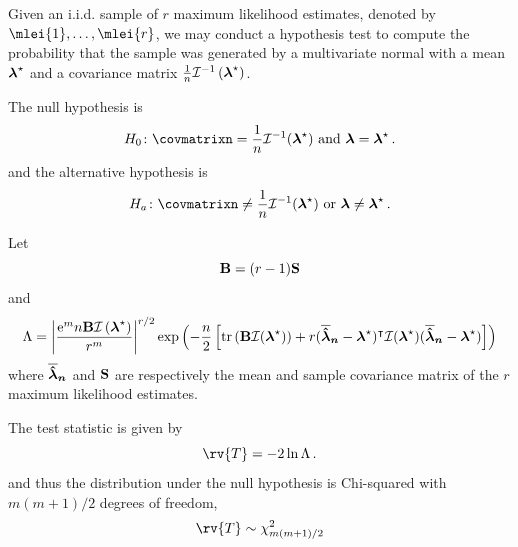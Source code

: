 \documentclass[../main.tex]{subfiles}
\begin{document}
Given an i.i.d. sample of $r$ maximum likelihood estimates, denoted by $\mlei{1}, \ldots, \mlei{r}$, we may conduct a hypothesis test to compute the probability that the sample was generated by a multivariate normal with a mean ${\boldsymbol{\lambda}}^{\star}$ and a covariance matrix $\frac{1}{n} \mathcal{I}^{-1}\left({\boldsymbol{\lambda}}^{\star}\right)$.

The null hypothesis is
\begin{equation}
    H_0 \colon \covmatrixn = \frac{1}{n} \infomatrx^{-1}(\tparam{\vec\lambda}) \text{ and } \vec\lambda = \tparam{\vec\lambda}\,.
\end{equation}
and the alternative hypothesis is
\begin{equation}
    H_a \colon \covmatrixn \neq \frac{1}{n} \infomatrx^{-1}(\tparam{\vec\lambda}) \text{ or } \vec\lambda \neq \tparam{\vec\lambda}\,.
\end{equation}

Let
\begin{equation}
    \mathbf{B} = (r-1)\mathbf{S}
\end{equation}
and
\begin{equation}
    \Lambda = \left\vert \frac{\mathrm{e}^m n \mathbf{B} \mathcal{I}\left({\boldsymbol{\lambda}}^{\star}\right)}{r^m} \right\vert^{r / 2}
        \exp
        \left(
            -\frac{n}{2} \left[
                \operatorname{tr}\left(
                \mathbf{B} \mathcal{I}({\boldsymbol{\lambda}}^{\star})\right) +
                r (\boldsymbol{\overline{\hat{\lambda}}_n} - {\boldsymbol{\lambda}}^{\star})^\intercal
                \mathcal{I}({\boldsymbol{\lambda}}^{\star})
                (\boldsymbol{\overline{\hat{\lambda}}_n} - {\boldsymbol{\lambda}}^{\star})
            \right]
        \right)
\end{equation}
where $\boldsymbol{\overline{\hat{\lambda}}_n}$ and $\mathbf{S}$ are respectively the mean and sample covariance matrix of the $r$ maximum likelihood estimates.

The test statistic is given by
\begin{equation}
    \rv{T} = -2 \ln \Lambda\,.
\end{equation}
and thus the distribution under the null hypothesis is Chi-squared with $m(m+1)/2$ degrees of freedom,
\begin{equation}
    \rv{T} \sim \chi_{m(m + 1)/2}^2
\end{equation}
\end{document}
